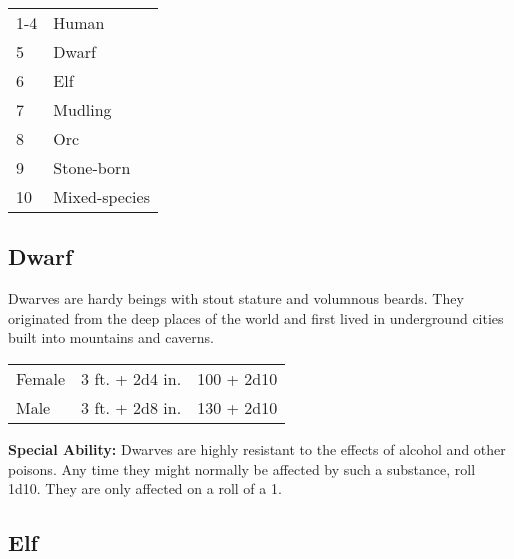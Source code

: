 \begin{multicols}{2}
\begin{center}
{
\begin{xtabular}{|l|l|}
1-4 & Human \\
5 & Dwarf \\
6 & Elf \\
7 & Mudling \\
8 & Orc \\
9 & Stone-born \\
10 & Mixed-species \\
\hline
\end{xtabular}
}
\end{center}

\subsection{Dwarf}

Dwarves are hardy beings with stout stature and volumnous beards.
They originated from the deep places of the world and first lived in underground
cities built into mountains and caverns.

\begin{center}
{
\begin{xtabular}{|l|l|l|}
Female & 3 ft. + 2d4 in. & 100 + 2d10 \\
Male & 3 ft. + 2d8 in. & 130 + 2d10 \\
\hline
\end{xtabular}
}
\end{center}

\textbf{Special Ability:} Dwarves are highly resistant to the effects of alcohol and other poisons. Any time they might normally be affected by such a substance, roll 1d10. They are only affected on a roll of a 1.

\subsection{Elf}


\end{multicols}
